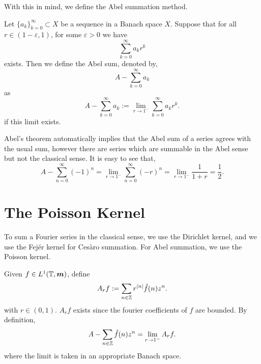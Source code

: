 With this in mind, we define the Abel summation method.
\begin{definition}
    Let $\{a_k\}_{k=0}^\infty \subset X$ be a sequence in a Banach space $X$. Suppose that for 
    all $r \in (1-\varepsilon,1)$, for some $\varepsilon > 0$ we have
    \begin{equation*}
        \sum_{k=0}^\infty a_k r^k
    \end{equation*}
    exists.
    Then we define the Abel sum, 
    denoted by,
    \begin{equation*}
        A-\sum_{k=0}^\infty a_k
    \end{equation*}
    as
    \begin{equation*}
        A-\sum_{k=0}^\infty a_k := \lim_{r\rightarrow 1^-} \sum_{k=0}^\infty a_k r^k.
    \end{equation*}
    if this limit exists.
\end{definition}
Abel's theorem automatically implies that the Abel sum of a series
agrees with the usual sum, however there are series which are summable
in the Abel sense but not the classical sense. It is easy to see that,
\begin{equation*}
    A-\sum_{n=0}^\infty (-1)^n = \lim_{r\rightarrow 1^-} \sum_{n=0}^\infty (-r)^n = \lim_{r\rightarrow 1^-} \frac{1}{1+r} = \frac{1}{2}.
\end{equation*}

\section{The Poisson Kernel}
To sum a Fourier series in the classical sense, we use the Dirichlet kernel,
and we use the Fej\'er kernel for Ces\`aro summation. For Abel summation,
we use the Poisson kernel.

Given $f \in L^1(\mathbb{T},\boldsymbol{m})$, define
\begin{equation*}
    A_r f := \sum_{n \in \mathbb{Z}} r^{|n|} \hat{f}(n) z^n.
\end{equation*}
with $r \in (0,1)$.
$A_r f$ exists since the fourier coefficients of $f$ are bounded. By definition,
\begin{equation*}
    A-\sum_{n\in \mathbb{Z}} \hat{f}(n) z^n = \lim_{r\rightarrow 1^-} A_r f.
\end{equation*}
where the limit is taken in an appropriate Banach space.

